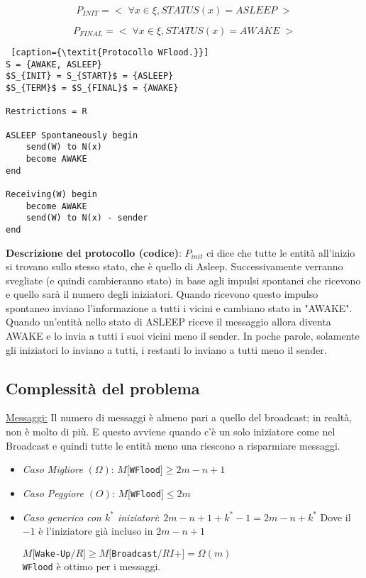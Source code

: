 $$
    P_{INIT} =<\; \forall x \in \xi, STATUS(x) = ASLEEP \;>
$$

$$
    P_{FINAL} =<\; \forall x \in \xi, STATUS(x) = AWAKE \;>
$$

\begin{lstlisting} [caption={\textit{Protocollo WFlood.}}]
S = {AWAKE, ASLEEP}
$S_{INIT} = S_{START}$ = {ASLEEP}
$S_{TERM}$ = $S_{FINAL}$ = {AWAKE}

Restrictions = R

ASLEEP Spontaneously begin 
    send(W) to N(x)
    become AWAKE
end

Receiving(W) begin
    become AWAKE
    send(W) to N(x) - sender
end
\end{lstlisting}

\textbf{Descrizione del protocollo (codice)}: $P_{init}$ ci dice che tutte le
entità all'inizio si trovano sullo stesso stato, che è quello di Asleep.
Successivamente verranno svegliate (e quindi cambieranno stato) in base agli
impulsi spontanei che ricevono e quello sarà il numero degli iniziatori. Quando
ricevono questo impulso spontaneo inviano l'informazione a tutti i vicini e
cambiano stato in "AWAKE". Quando un'entità nello stato di ASLEEP riceve il
messaggio allora diventa AWAKE e lo invia a tutti i suoi vicini meno il sender.
In poche parole, solamente gli iniziatori lo inviano a tutti, i restanti lo
inviano a tutti meno il sender.

\subsection{Complessità del problema}
\underline{Messaggi:}
Il numero di messaggi è almeno pari a quello del broadcast; in realtà, non è
molto di più. E questo avviene quando c'è un solo iniziatore come nel Broadcast
e quindi tutte le entità meno una riescono a risparmiare messaggi.

\begin{itemize}
    \item \textit{Caso Migliore} $(\Omega)$: $M[$\texttt{WFlood}$] \geq 2m - n +
              1$
    \item \textit{Caso Peggiore} $(O)$: $M[$\texttt{WFlood}$] \leq 2m$
    \item \textit{Caso generico con $k^*$ iniziatori}: $2m-n+1 + k^* -1 =
              2m-n+k^*$ Dove il $-1$ è l'iniziatore già incluso in $2m-n+1$

          $M[$\texttt{Wake-Up}$/R] \geq M[$\texttt{Broadcast}$/RI+] =
              \Omega(m)$\\
          \texttt{WFlood} è ottimo per i messaggi.
\end{itemize}

